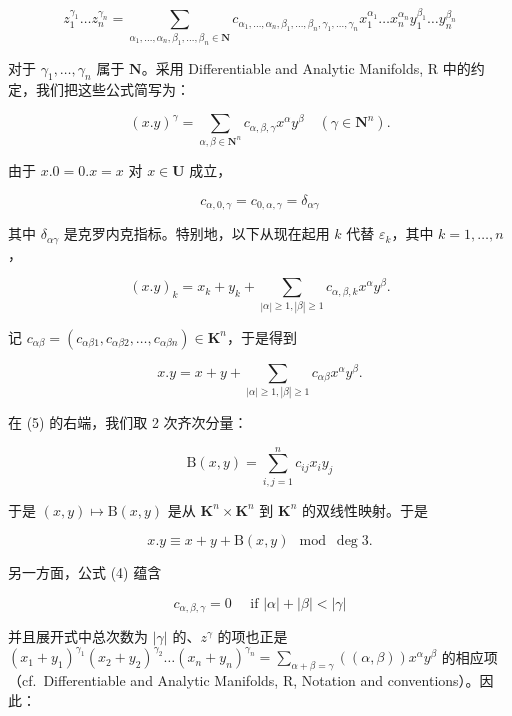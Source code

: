 \[
z _ {1} ^ {\gamma_ {1}} \dots z _ {n} ^ {\gamma_ {n}} = \sum_ {\alpha_ {1},\dots,\alpha_ {n},\beta_ {1},\dots,\beta_ {n} \in \mathbf {N}} c _ {\alpha_ {1},\dots,\alpha_ {n},\beta_ {1},\dots,\beta_ {n},\gamma_ {1},\dots,\gamma_ {n}} x _ {1} ^ {\alpha_ {1}} \dots x _ {n} ^ {\alpha_ {n}} y _ {1} ^ {\beta_ {1}} \dots y _ {n} ^ {\beta_ {n}}\tag{1}
\]

对于 \(\gamma_{1},\ldots,\gamma_{n}\) 属于 \(\mathbf{N}\)。采用 Differentiable and Analytic Manifolds, R 中的约定，我们把这些公式简写为：

\[
(x. y) ^ {\gamma} = \sum_ {\alpha , \beta \in \mathbf {N} ^ {n}} c _ {\alpha , \beta , \gamma} x ^ {\alpha} y ^ {\beta} \quad (\gamma \in \mathbf {N} ^ {n}).\tag{2}
\]

由于 \(x.0 = 0.x = x\) 对 \(x\in \mathbf{U}\) 成立，

\[
c _ {\alpha , 0, \gamma} = c _ {0, \alpha , \gamma} = \delta_ {\alpha \gamma}\tag{3}
\]

其中 \(\delta_{\alpha \gamma}\) 是克罗内克指标。特别地，以下从现在起用 \(k\) 代替 \(\varepsilon_k\)，其中 \(k = 1, \ldots, n\)，

\[
(x. y) _ {k} = x _ {k} + y _ {k} + \sum_ {| \alpha | \geqslant 1, | \beta | \geqslant 1} c _ {\alpha , \beta , k} x ^ {\alpha} y ^ {\beta}.\tag{4}
\]

记 \(c_{\alpha \beta} = (c_{\alpha \beta 1}, c_{\alpha \beta 2}, \ldots, c_{\alpha \beta n}) \in \mathbf{K}^n\)，于是得到

\[
x. y = x + y + \sum_ {| \alpha | \geqslant 1, | \beta | \geqslant 1} c _ {\alpha \beta} x ^ {\alpha} y ^ {\beta}.\tag{5}
\]

在 (5) 的右端，我们取 2 次齐次分量：

\[
\mathrm{B} (x, y) = \sum_ {i, j = 1} ^ {n} c _ {i j} x _ {i} y _ {j}
\]

于是 \((x,y)\mapsto \mathrm{B}(x,y)\) 是从 \(\mathbf{K}^n\times \mathbf{K}^n\) 到 \(\mathbf{K}^n\) 的双线性映射。于是

\[
x. y \equiv x + y + \mathrm{B} (x, y) \mod \deg 3.\tag{6}
\]

另一方面，公式 (4) 蕴含

\[
c _ {\alpha , \beta , \gamma} = 0 \quad \text { if } | \alpha | + | \beta | <   | \gamma |\tag{7}
\]

并且展开式中总次数为 \(|\gamma|\) 的、\(z^\gamma\) 的项也正是 \((x_1 + y_1)^{\gamma_1}(x_2 + y_2)^{\gamma_2} \ldots (x_n + y_n)^{\gamma_n} = \sum_{\alpha + \beta = \gamma} ((\alpha, \beta)) x^\alpha y^\beta\) 的相应项（cf.~Differentiable and Analytic Manifolds, R, Notation and conventions）。因此：


